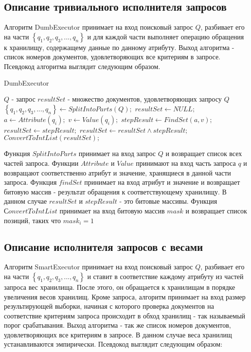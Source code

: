 \documentclass{matmex-diploma}
\begin{document}
    \subsection{Описание тривиального исполнителя запросов}
        Алгоритм DumbExecutor принимает на вход поисковый запрос $Q$, разбивает его на части $\left\{ q_1, q_2, q_3, ... , q_n \right\} $ и для каждой части выполняет операцию обращения к хранилищу, содержащему данные по данному атрибуту. Выход алгоритма - список номеров документов, удовлетворяющих все критериям в запросе. Псевдокод алгоритма выглядит следующим образом.
        \begin{algorithm}                   
        \caption{DumbExecutor}              
        \label{dumb}                        
            \begin{algorithmic}        
                \REQUIRE $Q$ - запрос
                \ENSURE $resultSet$ - множество документов, удовлетворяющих запросу $Q$
                \STATE $\left\{ q_1, q_2, q_3, ... , q_n \right\} \leftarrow SplitIntoParts(Q);$
                \STATE $resultSet \leftarrow NULL;$
                    \STATE $a \leftarrow Attribute(q_i);$
                    \STATE $v \leftarrow Value(q_i);$
                    \STATE $stepResult \leftarrow FindSet(a, v);$
                        \STATE $resultSet \leftarrow stepResult;$
                    \ENDIF
                    \STATE $resultSet \leftarrow resultSet \land stepResult;$
                \ENDFOR
                \RETURN $ConvertToIntList(resultSet);$
            \end{algorithmic}
        \end{algorithm}
        
        Функция $SplitIntoParts$ принимает на вход запрос $Q$ и возвращает список всех частей запроса. Функции $Attribute$ и $Value$ принимают на вход часть запроса $q$ и возвращают соответственно атрибут и значение, хранящиеся в данной части запроса. Функция $findSet$ принимает на вход атрибут и значение и возвращает битовую массив - результат обращения к соответствующему хранилищу. В данном случае $resultSet $ и $stepResult$ - это битовые массивы. Функция $СonvertToIntList$ принимает на вход битовую массив $mask$ и возвращает список позиций, таких что $mask_i = 1$ 
        
    \subsection{Описание исполнителя запросов с весами}
        Алгоритм SmartExecutor принимает на вход поисковый запрос $Q$, разбивает его на части $\left\{ q_1, q_2, q_3, ... , q_n \right\} $ и ставит в соответствие каждому атрибуту из частей запроса вес хранилища. После этого, он обращается к хранилищам в порядке увеличения весов хранилищ. Кроме запроса, алгоритм принимает на вход размер результирующей выборки, начиная с которого проверка документов на соответствие критериям запроса происходит в обход хранилищ - так называемый порог срабатывания. Выход алгоритма - так же список номеров документов, удовлетворяющих все критериям в запросе. В данном случае веса хранилищ устанавливаются эмпирически. Псевдокод выглядит следующим образом:
        
\end{document}

